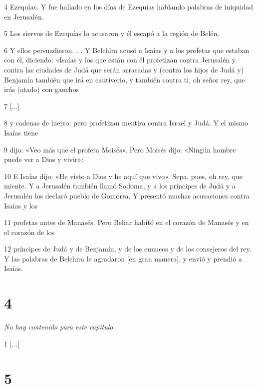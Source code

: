 \par 4 Ezequías. Y fue hallado en los días de Ezequías hablando palabras de iniquidad en Jerusalén.

\par 5 Los siervos de Ezequías lo acusaron y él escapó a la región de Belén.

\par 6 Y ellos persuadieron. . . Y Belchlra acusó a Isaías y a los profetas que estaban con él, diciendo: «Isaías y los que están con él profetizan contra Jerusalén y contra las ciudades de Judá que serán arrasadas y (contra los hijos de Judá y) Benjamín también que irá en cautiverio, y también contra ti, oh señor rey, que irás (atado) con ganchos

\par 7 [...]

\par 8 y cadenas de hierro; pero profetizan mentira contra Israel y Judá. Y el mismo Isaías tiene

\par 9 dijo: «Veo más que el profeta Moisés». Pero Moisés dijo: «Ningún hombre puede ver a Dios y vivir»:

\par 10 E Isaías dijo: «He visto a Dios y he aquí que vivo». Sepa, pues, oh rey, que miente. Y a Jerusalén también llamó Sodoma, y ​​a los príncipes de Judá y a Jerusalén los declaró pueblo de Gomorra. Y presentó muchas acusaciones contra Isaías y los

\par 11 profetas antes de Manasés. Pero Beliar habitó en el corazón de Manasés y en el corazón de los

\par 12 príncipes de Judá y de Benjamín, y de los eunucos y de los consejeros del rey. Y las palabras de Belchira le agradaron [en gran manera], y envió y prendió a Isaías.

\chapter{4}

\par \textit{No hay contenido para este capítulo}

\par 1 [...]

\chapter{5}

